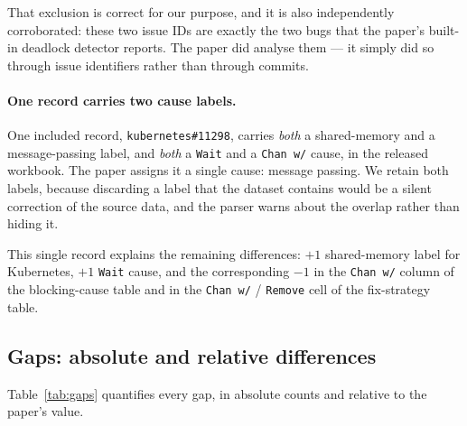 \documentclass[11pt]{article}
\begin{document}
That exclusion is correct for our purpose, and it is also independently
corroborated: these two issue IDs are exactly the two bugs that the paper's
built-in deadlock detector reports. The paper did analyse them --- it simply
did so through issue identifiers rather than through commits.

\paragraph{One record carries two cause labels.} One included record,
\texttt{kubernetes\#11298}, carries \emph{both} a shared-memory and a
message-passing label, and \emph{both} a \texttt{Wait} and a \texttt{Chan w/}
cause, in the released workbook. The paper assigns it a single cause: message
passing. We retain both labels, because discarding a label that the dataset
contains would be a silent correction of the source data, and the parser
warns about the overlap rather than hiding it.

This single record explains the remaining differences: $+1$ shared-memory
label for Kubernetes, $+1$ \texttt{Wait} cause, and the corresponding $-1$ in
the \texttt{Chan w/} column of the blocking-cause table and in the
\texttt{Chan w/} / \texttt{Remove} cell of the fix-strategy table.

\subsection{Gaps: absolute and relative differences}

Table~\ref{tab:gaps} quantifies every gap, in absolute counts and relative
to the paper's value.
\end{document}
